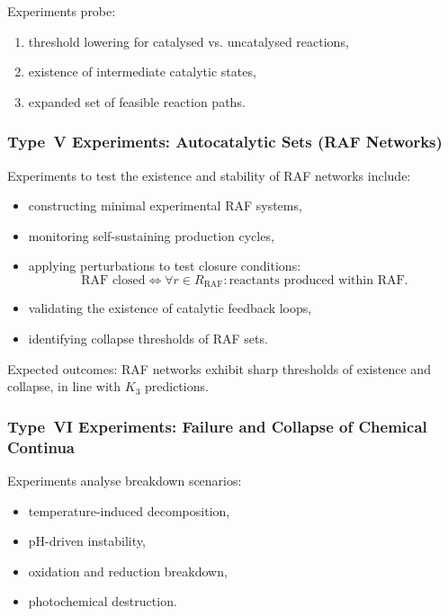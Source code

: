 Experiments probe:

\begin{enumerate}
    \item threshold lowering for catalysed vs. uncatalysed reactions,
    \item existence of intermediate catalytic states,
    \item expanded set of feasible reaction paths.
\end{enumerate}



\subsubsection{Type~V Experiments: Autocatalytic Sets (RAF Networks)}

Experiments to test the existence and stability of RAF networks include:

\begin{itemize}
    \item constructing minimal experimental RAF systems,
    \item monitoring self-sustaining production cycles,
    \item applying perturbations to test closure conditions:
          \[
             \text{RAF closed}
             \Leftrightarrow
             \forall r \in R_{\mathrm{RAF}}:
             \text{reactants produced within RAF}.
          \]
    \item validating the existence of catalytic feedback loops,
    \item identifying collapse thresholds of RAF sets.
\end{itemize}

Expected outcomes:
RAF networks exhibit sharp thresholds of existence and collapse, in line with
$K_3$ predictions.



\subsubsection{Type~VI Experiments: Failure and Collapse of Chemical Continua}

Experiments analyse breakdown scenarios:

\begin{itemize}
    \item temperature-induced decomposition,
    \item pH-driven instability,
    \item oxidation and reduction breakdown,
    \item photochemical destruction.
\end{itemize}

